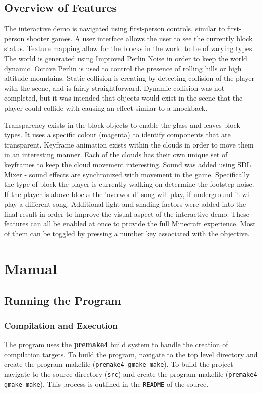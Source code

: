 \documentclass{book}
\begin{document}
\section{Overview of Features}
The interactive demo is navigated using first-person controls, similar to first-person shooter games.
A user interface allows the user to see the currently block status.  Texture mapping allow for the blocks in the world to be of varying types.  The world is generated using Improved Perlin Noise in order to keep the world dynamic.  Octave Perlin is used to control the presence of rolling hills or high altitude mountains.  Static collision is creating by detecting collision of the player with the scene, and is fairly straightforward.  Dynamic collision was not completed, but it was intended that objects would exist in the scene that the player could collide with causing an effect similar to a knockback.  

Transparency exists in the block objects to enable the glass and leaves block types.  It uses a specific colour (magenta) to identify components that are transparent.  Keyframe animation exists within the clouds in order to move them in an interesting manner.  Each of the clouds has their own unique set of keyframes to keep the cloud movement interesting.  Sound was added using SDL Mixer - sound effects are synchronized with movement in the game.  Specifically the type of block the player is currently walking on determine the footstep noise.  If the player is above blocks the 'overworld' song will play, if underground it will play a different song. Additional light and shading factors were added into the final result in order to improve the visual aspect of the interactive demo.  These features can all be enabled at once to provide the full Minecraft experience. Most of them can be toggled by pressing a number key associated with the objective. 


\chapter{Manual}
\section{Running the Program}
\subsection{Compilation and Execution}
The program uses the \textbf{premake4} build system to handle the creation of compilation targets.  To build the program, navigate to the top level directory and create the program makefile (\texttt{premake4 gmake  make}).  To build the project navigate to the source directory (\texttt{src}) and create the program makefile (\texttt{premake4 gmake make}).
This process is outlined in the \texttt{README} of the source.
\end{document}
